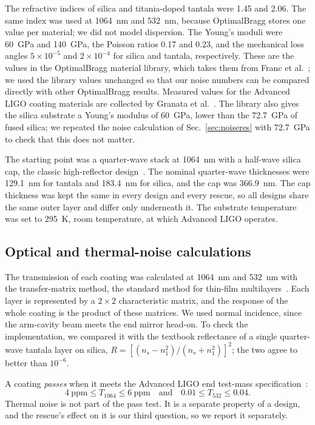 The refractive indices of silica and titania-doped tantala were 1.45 and 2.06. The same index was used at 1064~nm and 532~nm, because OptimalBragg stores one value per material; we did not model dispersion. The Young's moduli were 60~GPa and 140~GPa, the Poisson ratios 0.17 and 0.23, and the mechanical loss angles $5\times10^{-5}$ and $2\times10^{-4}$ for silica and tantala, respectively. These are the values in the OptimalBragg material library, which takes them from Franc et al.~\cite{MaterialsSource}; we used the library values unchanged so that our noise numbers can be compared directly with other OptimalBragg results. Measured values for the Advanced LIGO coating materials are collected by Granata et al.~\cite{Granata2020}. The library also gives the silica substrate a Young's modulus of 60~GPa, lower than the 72.7~GPa of fused silica; we repeated the noise calculation of Sec.~\ref{sec:noiseres} with 72.7~GPa to check that this does not matter.

The starting point was a quarter-wave stack at 1064~nm with a half-wave silica cap, the classic high-reflector design~\cite{Macleod2018}. The nominal quarter-wave thicknesses were 129.1~nm for tantala and 183.4~nm for silica, and the cap was 366.9~nm. The cap thickness was kept the same in every design and every rescue, so all designs share the same outer layer and differ only underneath it. The substrate temperature was set to 295~K, room temperature, at which Advanced LIGO operates.

\subsection{Optical and thermal-noise calculations}

The transmission of each coating was calculated at 1064~nm and 532~nm with the transfer-matrix method, the standard method for thin-film multilayers~\cite{Macleod2018}. Each layer is represented by a $2\times2$ characteristic matrix, and the response of the whole coating is the product of these matrices. We used normal incidence, since the arm-cavity beam meets the end mirror head-on. To check the implementation, we compared it with the textbook reflectance of a single quarter-wave tantala layer on silica, $R = \left[(n_s - n_1^2)/(n_s + n_1^2)\right]^2$; the two agree to better than $10^{-6}$.

A coating \emph{passes} when it meets the Advanced LIGO end test-mass specification~\cite{E0900068}:
\begin{equation}
4~\mathrm{ppm} \le T_{1064} \le 6~\mathrm{ppm}
\quad\text{and}\quad
0.01 \le T_{532} \le 0.04 .
\label{eq:pass}
\end{equation}
Thermal noise is not part of the pass test. It is a separate property of a design, and the rescue's effect on it is our third question, so we report it separately.

